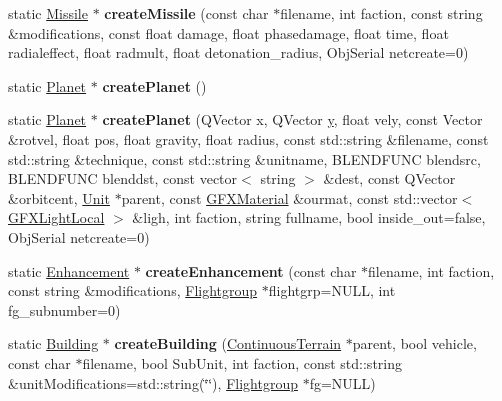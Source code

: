 \begin{DoxyCompactItemize}
\item 
static \hyperlink{classMissile}{Missile} $\ast$ {\bfseries create\+Missile} (const char $\ast$filename, int faction, const string \&modifications, const float damage, float phasedamage, float time, float radialeffect, float radmult, float detonation\+\_\+radius, Obj\+Serial netcreate=0)\hypertarget{classUnitFactory_a3621db6385d03ba6d3f9d5d5719b0ed3}{}\label{classUnitFactory_a3621db6385d03ba6d3f9d5d5719b0ed3}

\item 
static \hyperlink{classPlanet}{Planet} $\ast$ {\bfseries create\+Planet} ()\hypertarget{classUnitFactory_ada4e217d2d9c6bcb749e7716689ed96c}{}\label{classUnitFactory_ada4e217d2d9c6bcb749e7716689ed96c}

\item 
static \hyperlink{classPlanet}{Planet} $\ast$ {\bfseries create\+Planet} (Q\+Vector x, Q\+Vector \hyperlink{IceUtils_8h_aa7ffaed69623192258fb8679569ff9ba}{y}, float vely, const Vector \&rotvel, float pos, float gravity, float radius, const std\+::string \&filename, const std\+::string \&technique, const std\+::string \&unitname, B\+L\+E\+N\+D\+F\+U\+NC blendsrc, B\+L\+E\+N\+D\+F\+U\+NC blenddst, const vector$<$ string $>$ \&dest, const Q\+Vector \&orbitcent, \hyperlink{classUnit}{Unit} $\ast$parent, const \hyperlink{structGFXMaterial}{G\+F\+X\+Material} \&ourmat, const std\+::vector$<$ \hyperlink{structGFXLightLocal}{G\+F\+X\+Light\+Local} $>$ \&ligh, int faction, string fullname, bool inside\+\_\+out=false, Obj\+Serial netcreate=0)\hypertarget{classUnitFactory_a30d450eca3e19251fe06d1c079b95139}{}\label{classUnitFactory_a30d450eca3e19251fe06d1c079b95139}

\item 
static \hyperlink{classEnhancement}{Enhancement} $\ast$ {\bfseries create\+Enhancement} (const char $\ast$filename, int faction, const string \&modifications, \hyperlink{classFlightgroup}{Flightgroup} $\ast$flightgrp=N\+U\+LL, int fg\+\_\+subnumber=0)\hypertarget{classUnitFactory_a47ea935cdb7901c49a3a6f3460f02baf}{}\label{classUnitFactory_a47ea935cdb7901c49a3a6f3460f02baf}

\item 
static \hyperlink{classBuilding}{Building} $\ast$ {\bfseries create\+Building} (\hyperlink{classContinuousTerrain}{Continuous\+Terrain} $\ast$parent, bool vehicle, const char $\ast$filename, bool Sub\+Unit, int faction, const std\+::string \&unit\+Modifications=std\+::string(\char`\"{}\char`\"{}), \hyperlink{classFlightgroup}{Flightgroup} $\ast$fg=N\+U\+LL)\hypertarget{classUnitFactory_a806dcd4d145fd6269cfbab7779467046}{}\label{classUnitFactory_a806dcd4d145fd6269cfbab7779467046}


\end{DoxyCompactItemize}
